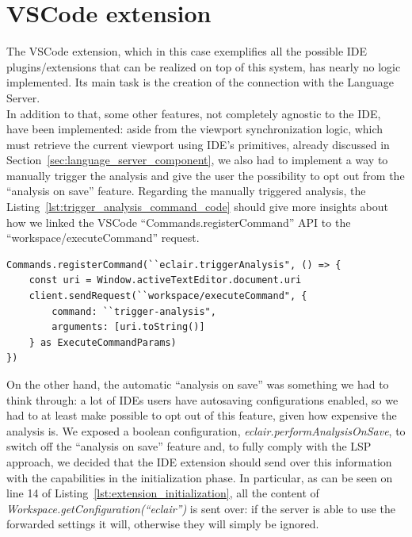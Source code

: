 \section{VSCode extension}\label{sec:cap_sec_subsec}
The VSCode extension, which in this case exemplifies all the possible IDE plugins/extensions that can be realized on top of this system, has nearly no logic implemented. 
Its main task is the creation of the connection with the Language Server.
\\
In addition to that, some other features, not completely agnostic to the IDE, have been implemented: aside from the viewport synchronization logic, which must retrieve the current viewport using IDE's primitives, already discussed in Section~\ref{sec:language_server_component}, 
we also had to implement a way to manually trigger the analysis and give the user the possibility to opt out from the ``analysis on save'' feature.
Regarding the manually triggered analysis, the Listing~\ref{lst:trigger_analysis_command_code} should give more insights about how we linked the VSCode ``Commands.registerCommand'' API to the ``workspace/executeCommand'' request.
\begin{lstlisting}[caption={VSCode extension triggerAnalysis command}, label={lst:trigger_analysis_command_code}]
Commands.registerCommand(``eclair.triggerAnalysis", () => {
	const uri = Window.activeTextEditor.document.uri
	client.sendRequest(``workspace/executeCommand", {
		command: ``trigger-analysis",
		arguments: [uri.toString()]
	} as ExecuteCommandParams)
})
\end{lstlisting}

On the other hand, the automatic ``analysis on save'' was something we had to think through: a lot of IDEs users have autosaving configurations enabled, so we had to at least make possible to opt out of this feature, given how expensive the analysis is.
We exposed a boolean configuration, \emph{eclair.performAnalysisOnSave}, to switch off the ``analysis on save'' feature and, to fully comply with the LSP approach, we decided that the IDE extension should send over this information with the capabilities in the initialization phase.
In particular, as can be seen on line 14 of Listing~\ref{lst:extension_initialization}, all the content of \emph{Workspace.getConfiguration(``eclair'')} is sent over: if the server is able to use the forwarded settings it will, otherwise they will simply be ignored.

